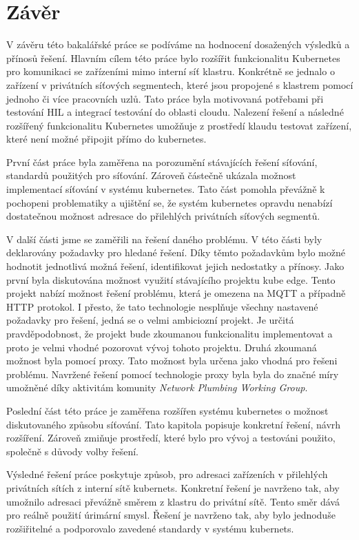 \chapter{Závěr}
V závěru této bakalářské práce se podíváme na hodnocení dosažených výsledků a přínosů řešení. Hlavním cílem této práce bylo rozšířit funkcionalitu Kubernetes pro komunikaci se zařízeními mimo interní síť klastru. Konkrétně se jednalo o zařízení v privátních síťových segmentech, které jsou propojené s klastrem pomocí jednoho či více pracovních uzlů. Tato práce byla motivovaná potřebami při testování HIL a integrací testování do oblasti cloudu. Nalezení řešení a následné rozšířený funkcionalitu Kubernetes umožňuje z prostředí klaudu testovat zařízení, které není možné připojit přímo do kubernetes.    

První část práce byla zaměřena na porozumění stávajících řešení síťování, standardů použitých pro síťování. Zároveň částečně ukázala možnost implementací síťování v systému kubernetes. Tato část pomohla převážně k pochopeni problematiky a ujištění se, že systém kubernetes opravdu nenabízí dostatečnou možnost adresace do přilehlých privátních síťových segmentů.

V další části jsme se zaměřili na řešení daného problému. V této části byly deklarovány požadavky pro hledané řešení. Díky těmto požadavkům bylo možné hodnotit jednotlivá možná řešení, identifikovat jejich nedostatky a přínosy. Jako první byla diskutována možnost využití stávajícího projektu kube edge. Tento projekt nabízí možnost řešení problému, která je omezena na MQTT a případně HTTP protokol. I přesto, že tato technologie nesplňuje všechny nastavené požadavky pro řešení, jedná se o velmi ambiciozní projekt. Je určitá pravděpodobnost, že projekt bude zkoumanou funkcionalitu implementovat a proto je velmi vhodné pozorovat vývoj tohoto projektu. Druhá zkoumaná možnost byla pomocí proxy. Tato možnost byla určena jako vhodná pro řešeni problému. Navržené řešení pomocí technologie proxy byla byla do značné míry umožněné díky aktivitám komunity \textit{Network Plumbing Working Group}.

Poslední část této práce je zaměřena rozšířen systému kubernetes o možnost diskutovaného způsobu síťování. Tato kapitola popisuje konkretní řešení, návrh rozšíření. Zároveň zmiňuje prostředí, které bylo pro vývoj a testováni použito, společně s důvody volby řešení.

Výsledné řešení práce poskytuje způsob, pro adresaci zařízeních v přilehlých privátních sítích z interní sítě kubernets. Konkretní řešení je navrženo tak, aby umožnilo adresaci převážně směrem z klastru do privátní sítě. Tento směr dává pro reálně použití úrimární smysl. Řešení je navrženo tak, aby bylo jednoduše rozšiřitelné a podporovalo zavedené standardy v systému kubernets.

